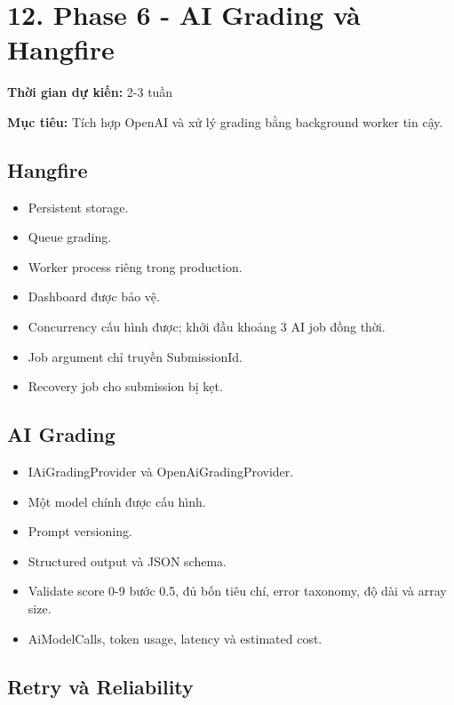 \documentclass[
  11pt,
  a4paper,
]{article}
\begin{document}
\section{12. Phase 6 - AI Grading và
Hangfire}\label{phase-6---ai-grading-vuxe0-hangfire}

\textbf{Thời gian dự kiến:} 2-3 tuần

\textbf{Mục tiêu:} Tích hợp OpenAI và xử lý grading bằng background
worker tin cậy.

\subsection{Hangfire}\label{hangfire}

\begin{itemize}
\item
  Persistent storage.
\item
  Queue grading.
\item
  Worker process riêng trong production.
\item
  Dashboard được bảo vệ.
\item
  Concurrency cấu hình được; khởi đầu khoảng 3 AI job đồng thời.
\item
  Job argument chỉ truyền SubmissionId.
\item
  Recovery job cho submission bị kẹt.
\end{itemize}

\subsection{AI Grading}\label{ai-grading}

\begin{itemize}
\item
  IAiGradingProvider và OpenAiGradingProvider.
\item
  Một model chính được cấu hình.
\item
  Prompt versioning.
\item
  Structured output và JSON schema.
\item
  Validate score 0-9 bước 0.5, đủ bốn tiêu chí, error taxonomy, độ dài
  và array size.
\item
  AiModelCalls, token usage, latency và estimated cost.
\end{itemize}

\subsection{Retry và Reliability}\label{retry-vuxe0-reliability}
\end{document}
